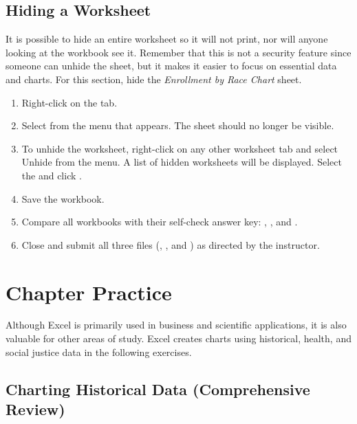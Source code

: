 \subsection{Hiding a Worksheet}

It is possible to hide an entire worksheet so it will not print, nor will anyone looking at the workbook see it. Remember that this is not a security feature since someone can unhide the sheet, but it makes it easier to focus on essential data and charts. For this section, hide the \textit{Enrollment by Race Chart} sheet.

\begin{enumbox}
	\begin{enumerate}
		\item Right-click on the  tab.
		\item Select  from the menu that appears. The  sheet should no longer be visible.
		\item To unhide the worksheet, right-click on any other worksheet tab and select Unhide from the menu. A list of hidden worksheets will be displayed. Select the  and click .
		\item Save the  workbook.
		\item Compare all workbooks with their self-check answer key: , , and .
		\item Close and submit all three files (, , and ) as directed by the instructor.
	\end{enumerate}
\end{enumbox}
	
\section{Chapter Practice}

Although Excel is primarily used in business and scientific applications, it is also valuable for other areas of study. Excel creates charts using historical, health, and social justice data in the following exercises.

\subsection{Charting Historical Data (Comprehensive Review)}

